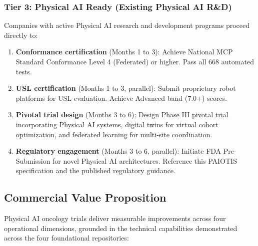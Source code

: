 \documentclass[11pt,letterpaper]{article}
\begin{document}
\subsubsection{Tier 3: Physical AI Ready (Existing Physical AI R\&D)}

Companies with active Physical AI research and development programs \SHOULD{} proceed directly to:

\begin{enumerate}
  \item \textbf{Conformance certification} (Months 1 to 3): Achieve National MCP Standard Conformance Level 4 (Federated) or higher. Pass all 668 automated tests.
  \item \textbf{USL certification} (Months 1 to 3, parallel): Submit proprietary robot platforms for USL evaluation. Achieve Advanced band (7.0+) scores.
  \item \textbf{Pivotal trial design} (Months 3 to 6): Design Phase III pivotal trial incorporating Physical AI systems, digital twins for virtual cohort optimization, and federated learning for multi-site coordination.
  \item \textbf{Regulatory engagement} (Months 3 to 6, parallel): Initiate FDA Pre-Submission for novel Physical AI architectures. Reference this PAIOTIS specification and the published regulatory guidance.
\end{enumerate}

\subsection{Commercial Value Proposition}

Physical AI oncology trials deliver measurable improvements across four operational dimensions, grounded in the technical capabilities demonstrated across the four foundational repositories:
\end{document}
